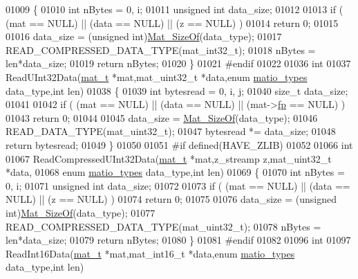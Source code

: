 \begin{DoxyCode}
01009 \{
01010     \textcolor{keywordtype}{int} nBytes = 0, i;
01011     \textcolor{keywordtype}{unsigned} \textcolor{keywordtype}{int} data\_size;
01012 
01013     \textcolor{keywordflow}{if} ( (mat == NULL) || (data == NULL) || (z == NULL) )
01014         \textcolor{keywordflow}{return} 0;
01015 
01016     data\_size = (\textcolor{keywordtype}{unsigned} int)\hyperlink{group__mat__util_gab6774aabdc124c540c1e7686d0804940}{Mat\_SizeOf}(data\_type);
01017     READ\_COMPRESSED\_DATA\_TYPE(mat\_int32\_t);
01018     nBytes = len*data\_size;
01019     \textcolor{keywordflow}{return} nBytes;
01020 \}
01021 \textcolor{preprocessor}{#endif}
01022 
01036 \textcolor{keywordtype}{int}
01037 ReadUInt32Data(\hyperlink{struct__mat__t}{mat\_t} *mat,mat\_uint32\_t *data,\textcolor{keyword}{enum} \hyperlink{group___m_a_t_gacf7b3b879282b7ab3a51190e49bf3453}{matio\_types} data\_type,\textcolor{keywordtype}{int} len)
01038 \{
01039     \textcolor{keywordtype}{int} bytesread = 0, i, j;
01040     \textcolor{keywordtype}{size\_t} data\_size;
01041 
01042     \textcolor{keywordflow}{if} ( (mat == NULL) || (data == NULL) || (mat->\hyperlink{struct__mat__t_a85f562e407ca9ad4d2a6e14f839432b7}{fp} == NULL) )
01043         \textcolor{keywordflow}{return} 0;
01044 
01045     data\_size = \hyperlink{group__mat__util_gab6774aabdc124c540c1e7686d0804940}{Mat\_SizeOf}(data\_type);
01046     READ\_DATA\_TYPE(mat\_uint32\_t);
01047     bytesread *= data\_size;
01048     \textcolor{keywordflow}{return} bytesread;
01049 \}
01050 
01051 \textcolor{preprocessor}{#if defined(HAVE\_ZLIB)}
01052 
01066 \textcolor{keywordtype}{int}
01067 ReadCompressedUInt32Data(\hyperlink{struct__mat__t}{mat\_t} *mat,z\_streamp z,mat\_uint32\_t *data,
01068     \textcolor{keyword}{enum} \hyperlink{group___m_a_t_gacf7b3b879282b7ab3a51190e49bf3453}{matio\_types} data\_type,\textcolor{keywordtype}{int} len)
01069 \{
01070     \textcolor{keywordtype}{int} nBytes = 0, i;
01071     \textcolor{keywordtype}{unsigned} \textcolor{keywordtype}{int} data\_size;
01072 
01073     \textcolor{keywordflow}{if} ( (mat == NULL) || (data == NULL) || (z == NULL) )
01074         \textcolor{keywordflow}{return} 0;
01075 
01076     data\_size = (\textcolor{keywordtype}{unsigned} int)\hyperlink{group__mat__util_gab6774aabdc124c540c1e7686d0804940}{Mat\_SizeOf}(data\_type);
01077     READ\_COMPRESSED\_DATA\_TYPE(mat\_uint32\_t);
01078     nBytes = len*data\_size;
01079     \textcolor{keywordflow}{return} nBytes;
01080 \}
01081 \textcolor{preprocessor}{#endif}
01082 
01096 \textcolor{keywordtype}{int}
01097 ReadInt16Data(\hyperlink{struct__mat__t}{mat\_t} *mat,mat\_int16\_t *data,\textcolor{keyword}{enum} \hyperlink{group___m_a_t_gacf7b3b879282b7ab3a51190e49bf3453}{matio\_types} data\_type,\textcolor{keywordtype}{int} len)

\end{DoxyCode}
